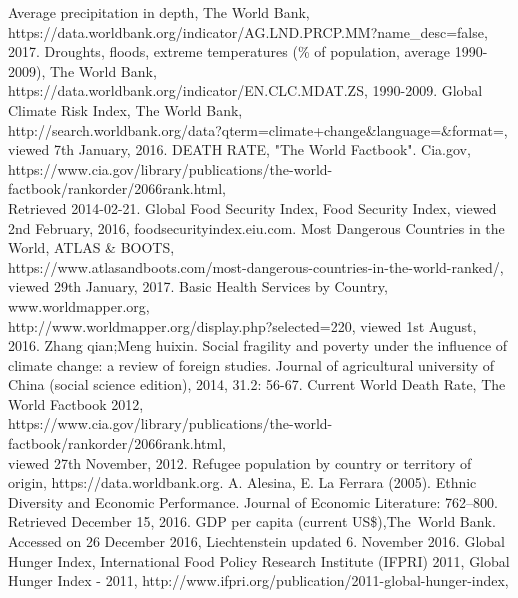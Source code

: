 \documentclass{mcmthesis}
\begin{document}
\newpage
\begin{thebibliography}{99}
 Average precipitation in depth, The World Bank, \\ 
https://data.worldbank.org/indicator/AG.LND.PRCP.MM?name\_desc=false, 
2017.
 Droughts, floods, extreme temperatures (\% of 
population, average 1990-2009), The World Bank, 
https://data.worldbank.org/indicator/EN.CLC.MDAT.ZS, 1990-2009.
 Global Climate Risk Index, The World Bank,\\
http://search.worldbank.org/data?qterm=climate+change\&language=\&format=,
\\viewed 7th January, 2016.
 DEATH RATE, "The World Factbook". Cia.gov, 
\\https://www.cia.gov/library/publications/the-world-factbook/rankorder/2066rank.html,\\ 
Retrieved 2014-02-21.
 Global Food Security Index, Food Security Index, viewed 2nd February, 2016, foodsecurityindex.eiu.com.
 Most Dangerous Countries in the World, ATLAS \& BOOTS,\\ 
https://www.atlasandboots.com/most-dangerous-countries-in-the-world-ranked/, \\
viewed 29th January, 2017.
 Basic Health Services by Country, www.worldmapper.org, \\
http://www.worldmapper.org/display.php?selected=220, viewed 1st August, 2016.
 Zhang qian;Meng huixin. Social fragility and 
poverty under the influence of climate change: a review of foreign studies. 
Journal of agricultural university of China (social science edition), 2014, 31.2: 56-67.
 Current World Death Rate, The World Factbook 2012,\\ 
https://www.cia.gov/library/publications/the-world-factbook/rankorder/2066rank.html, \\
viewed 27th November, 2012.
 Refugee population by country or territory of origin, https://data.worldbank.org.
 A. Alesina, E. La Ferrara (2005). Ethnic Diversity and Economic 
Performance. Journal of Economic Literature: 762–800. Retrieved December 15, 2016.
 GDP per capita (current US\$),The World Bank. Accessed on 26 December 
2016, Liechtenstein updated 6. November 2016.
 Global Hunger Index, International Food Policy Research Institute 
(IFPRI) 2011, Global Hunger Index - 2011,
http://www.ifpri.org/publication/2011-global-hunger-index, \\ 

\end{thebibliography}
\end{document}
